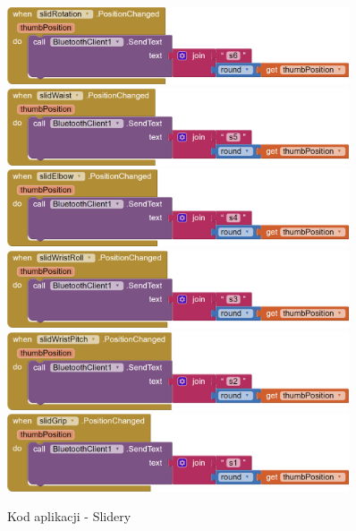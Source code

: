\documentclass[11pt,titlepage,a4paper]{article}
\begin{document}
\begin{figure}[p]
    \begin{center}
        \includegraphics[width=0.9\textwidth]{img/app_src/sliders/slidRotation.png}
        \includegraphics[width=0.9\textwidth]{img/app_src/sliders/slidWaist.png}
        \includegraphics[width=0.9\textwidth]{img/app_src/sliders/slidElbow.png}
        \includegraphics[width=0.9\textwidth]{img/app_src/sliders/slidWristRoll.png}
        \includegraphics[width=0.9\textwidth]{img/app_src/sliders/slidWristPitch.png}
        \includegraphics[width=0.9\textwidth]{img/app_src/sliders/slidGrip.png}
    \end{center}
    \caption{Kod aplikacji - Slidery}
    \label{AppSlidery}
\end{figure}
\end{document}
